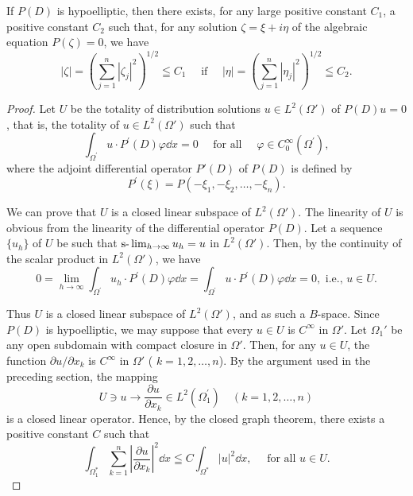 \begin{theoremn} If $P(D)$ is hypoelliptic, then there exists, for any large positive constant $C_{1}$, a positive constant $C_{2}$ such that, for any solution $\zeta = \xi + i\eta$ of the algebraic equation $P(\zeta) = 0$, we have
\begin{equation}\label{eq:II.7.2}
| \zeta | = \left(\sum\limits_{j=1} ^{n} | \zeta_{j} | ^{2}\right) ^{1/2} \leqq C _{1} \quad \text{ if } \quad | \eta | = \left(\sum\limits_{j=1} ^{n} | \eta_{j} | ^{2}\right) ^{1/2} \leqq C _{2}.
\end{equation}

\end{theoremn}
\begin{proof}
 Let $U$ be the totality of distribution solutions $u \in L^2(\Omega')$ of $P(D)u = 0$, that is, the totality of $u \in L^2(\Omega')$ such that 
\begin{equation}\label{eq:II.7.3}
\int_ {\Omega^{\prime}} u \cdot P ^{\prime} (D) \varphi \dd x = 0 \quad \text{ for all } \quad \varphi \in C _{0} ^{\infty} (\Omega^{\prime}),
\end{equation}
where the adjoint differential operator $P'(D)$ of $P(D)$ is defined by 
\begin{equation}\label{eq:II.7.4}
P ^{\prime} (\xi) = P (- \xi_{1}, - \xi_{2}, \dots , - \xi_{n}). \end{equation}

We can prove that $U$ is a closed linear subspace of $L^{2}(\Omega')$. The linearity of $U$ is obvious from the linearity of the differential operator $P(D)$. Let a sequence $\{u_{h}\}$ of $U$ be such that $\text{s-}\lim\nolimits_{h\to\infty}u_{h}=u$ in $L^{2}(\Omega')$. Then, by the continuity of the scalar product in $L^{2}(\Omega')$, we have 
\[
0 = \lim\limits _{h \rightarrow \infty} \int_ {\Omega^{\prime}} u _{h} \cdot P ^{\prime} (D) \varphi \dd x = \int_ {\Omega^{\prime}} u \cdot P ^{\prime} (D) \varphi \dd x = 0, \text{ i.e., } u \in U.
\]

Thus $U$ is a closed linear subspace of $L^{2}(\Omega')$, and as such a $B$-space. Since $P(D)$ is hypoelliptic, we may suppose that every $u \in U$ is $C^{\infty}$ in $\Omega'$. Let $\Omega_{1}'$ be any open subdomain with compact closure in $\Omega'$. Then, for any $u \in U$, the function $\partial u / \partial x_{k}$ is $C^{\infty}$ in $\Omega'$ ( $k = 1, 2, \ldots, n$). By the argument used in the preceding section, the mapping 
\[
U \ni u \rightarrow \frac {\partial u}{\partial x _{k}} \in L ^{2} (\Omega_{1} ^{\prime}) \quad (k = 1, 2, \dots , n)
\]
is a closed linear operator. Hence, by the closed graph theorem, there exists a positive constant $C$ such that 
\[
\int_ {\Omega_{1} ^{*}} \sum\limits_{k=1} ^{n} \left| \frac {\partial u}{\partial x _{k}} \right| ^{2} \dd x \leqq C \int_ {\Omega^{*}} | u | ^{2} \dd x, \quad \text{ for all } u \in U.
\]


\end{proof}
